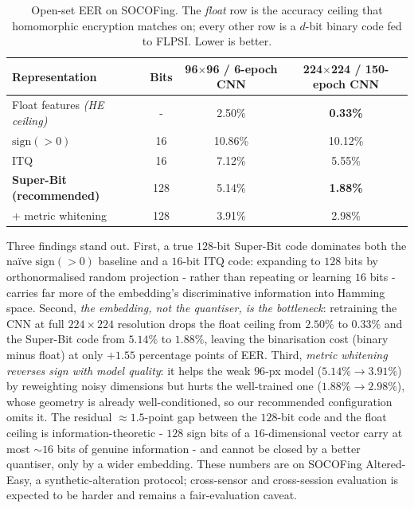 \documentclass[11pt,a4paper]{article}
\begin{document}
\begin{table}[h]
\centering
\caption{Open-set EER on SOCOFing. The \emph{float} row is the accuracy ceiling that
homomorphic encryption matches on; every other row is a $d$-bit binary code fed to
FLPSI. Lower is better.}
\label{tab:eer}
\begin{tabular}{lccc}
\hline
Representation & Bits & 96$\times$96 / 6-epoch CNN & 224$\times$224 / 150-epoch CNN \\
\hline
Float features \emph{(HE ceiling)}   & -  & 2.50\% & \textbf{0.33\%} \\
$\mathrm{sign}(>0)$                  & 16   & 10.86\% & 10.12\% \\
ITQ                                  & 16   & 7.12\%  & 5.55\% \\
\textbf{Super-Bit (recommended)}     & 128  & 5.14\%  & \textbf{1.88\%} \\
\quad{}+ metric whitening            & 128  & 3.91\%  & 2.98\% \\
\hline
\end{tabular}
\end{table}

Three findings stand out. First, a true $128$-bit Super-Bit code dominates both the
na\"ive $\mathrm{sign}(>0)$ baseline and a $16$-bit ITQ code: expanding to $128$ bits by
orthonormalised random projection - rather than repeating or learning $16$ bits -
carries far more of the embedding's discriminative information into Hamming space.
Second, \emph{the embedding, not the quantiser, is the bottleneck}: retraining the CNN
at full $224\times224$ resolution drops the float ceiling from $2.50\%$ to $0.33\%$ and
the Super-Bit code from $5.14\%$ to $1.88\%$, leaving the binarisation cost (binary
minus float) at only $+1.55$ percentage points of EER. Third, \emph{metric whitening
reverses sign with model quality}: it helps the weak $96$-px model
($5.14\%\!\to\!3.91\%$) by reweighting noisy dimensions but hurts the well-trained one
($1.88\%\!\to\!2.98\%$), whose geometry is already well-conditioned, so our recommended
configuration omits it. The residual $\approx 1.5$-point gap between the $128$-bit code
and the float ceiling is information-theoretic - $128$ sign bits of a $16$-dimensional
vector carry at most $\sim 16$ bits of genuine information - and cannot be closed by a
better quantiser, only by a wider embedding. These numbers are on SOCOFing
Altered-Easy, a synthetic-alteration protocol; cross-sensor and cross-session evaluation
is expected to be harder and remains a fair-evaluation caveat.
\end{document}
